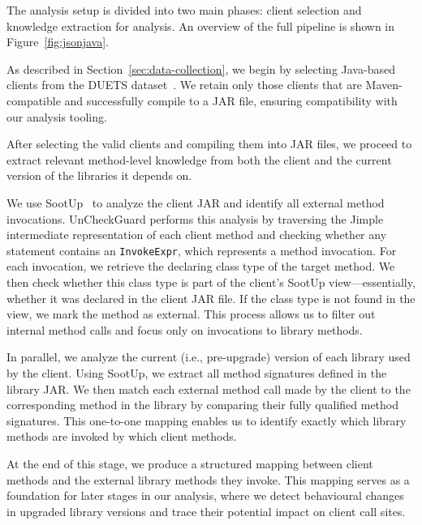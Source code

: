 The analysis setup is divided into two main phases: client selection and knowledge extraction for analysis. An overview of the full pipeline is shown in Figure~\ref{fig:jsonjava}.

As described in Section~\ref{sec:data-collection}, we begin by selecting Java-based clients from the DUETS dataset~\cite{durieux21:_duets}. We retain only those clients that are Maven-compatible and successfully compile to a JAR file, ensuring compatibility with our analysis tooling.

After selecting the valid clients and compiling them into JAR files, we proceed to extract relevant method-level knowledge from both the client and the current version of the libraries it depends on.

We use SootUp~\cite{Karakaya24:_sootup} to analyze the client JAR and identify all external method invocations. UnCheckGuard performs this analysis by traversing the Jimple intermediate representation of each client method and checking whether any statement contains an \texttt{InvokeExpr}, which represents a method invocation. For each invocation, we retrieve the declaring class type of the target method. We then check whether this class type is part of the client’s SootUp view---essentially, whether it was declared in the client JAR file. If the class type is not found in the view, we mark the method as external. This process allows us to filter out internal method calls and focus only on invocations to library methods.

In parallel, we analyze the current (i.e., pre-upgrade) version of each library used by the client. Using SootUp, we extract all method signatures defined in the library JAR. We then match each external method call made by the client to the corresponding method in the library by comparing their fully qualified method signatures. This one-to-one mapping enables us to identify exactly which library methods are invoked by which client methods.

At the end of this stage, we produce a structured mapping between client methods and the external library methods they invoke. This mapping serves as a foundation for later stages in our analysis, where we detect behavioural changes in upgraded library versions and trace their potential impact on client call sites.

